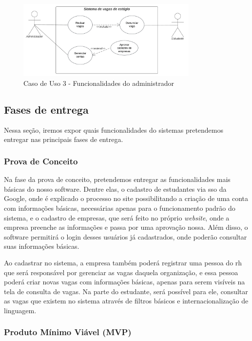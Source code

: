 \begin{figure}[H]
	\centering 
	\caption{\label{fig:caso3}Caso de Uso 3 - Funcionalidades do administrador}
	\includegraphics[width=0.8\textwidth]{imagens/caso-de-uso-3.png} 
\end{figure}

\subsection{Fases de entrega}

Nessa seção, iremos expor quais funcionalidades do sistemas pretendemos entregar nas principais fases de entrega.

\subsubsection{Prova de Conceito}

Na fase da prova de conceito, pretendemos entregar as funcionalidades mais básicas do nosso software. Dentre elas, o cadastro de estudantes via \ac{sso} da Google, onde é explicado o processo no site possibilitando a criação de uma conta com informações básicas, necessárias apenas para o funcionamento padrão do sistema, e o cadastro de empresas, que será feito no próprio \emph{website}, onde a empresa preenche as informações e passa por uma aprovação nossa. Além disso, o software permitirá o login desses usuários já cadastrados, onde poderão consultar suas informações básicas.

Ao cadastrar no sistema, a empresa também poderá registrar uma pessoa do \ac{rh} que será responsável por gerenciar as vagas daquela organização, e essa pessoa poderá criar novas vagas com informações básicas, apenas para serem visíveis na tela de consulta de vagas.
Na parte do estudante, será possível para ele, consultar as vagas que existem no sistema através de filtros básicos e internacionalização de linguagem.

\subsubsection{Produto Mínimo Viável (MVP)}

